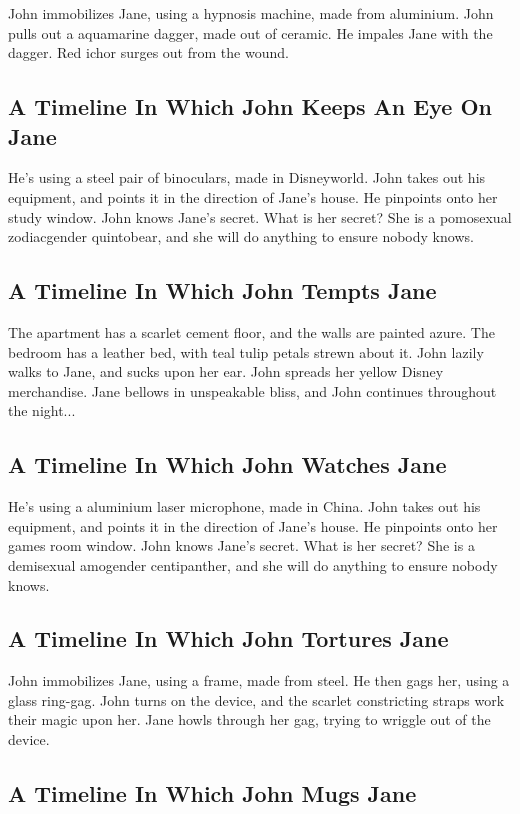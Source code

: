 \documentclass{article}
\begin{document}
John immobilizes Jane, using a hypnosis machine, made from aluminium.
John pulls out a aquamarine dagger, made out of ceramic.
He impales Jane with the dagger.
Red ichor surges out from the wound.
\subsection{A Timeline In Which John Keeps An Eye On Jane}


He's using a steel pair of binoculars, made in Disneyworld.
John takes out his equipment, and points it in the direction of Jane's house. He pinpoints onto her study window.
John knows Jane's secret. What is her secret? She is a pomosexual zodiacgender quintobear, and she will do anything to ensure nobody knows.
\subsection{A Timeline In Which John Tempts Jane}


The apartment has a scarlet cement floor, and the walls are painted azure.
The bedroom has a leather bed, with teal tulip petals strewn about it.
John lazily walks to Jane, and sucks upon her ear.
John spreads her yellow Disney merchandise.
Jane bellows in unspeakable bliss, and John continues throughout the night...
\subsection{A Timeline In Which John Watches Jane}


He's using a aluminium laser microphone, made in China.
John takes out his equipment, and points it in the direction of Jane's house. He pinpoints onto her games room window.
John knows Jane's secret. What is her secret? She is a demisexual amogender centipanther, and she will do anything to ensure nobody knows.
\subsection{A Timeline In Which John Tortures Jane}


John immobilizes Jane, using a frame, made from steel.
He then gags her, using a glass ring{-}gag.
John turns on the device, and the scarlet constricting straps work their magic upon her.
Jane howls through her gag, trying to wriggle out of the device.
\subsection{A Timeline In Which John Mugs Jane}
\end{document}
